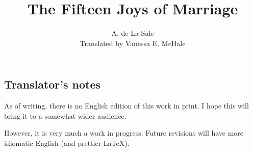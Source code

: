 \documentclass{book}
\begin{document}
\title{The Fifteen Joys of Marriage}
\author{A. de La Sale\\
Translated by Vanessa E. McHale}
\date{}
\maketitle
\tableofcontents

\subsection*{Translator's notes}
As of writing, there is no English edition of this work in print. I hope this will bring it to a somewhat wider audience. 

However, it is very much a work in progress. Future revisions will have more idiomatic English (and prettier \LaTeX). 
\end{document}
